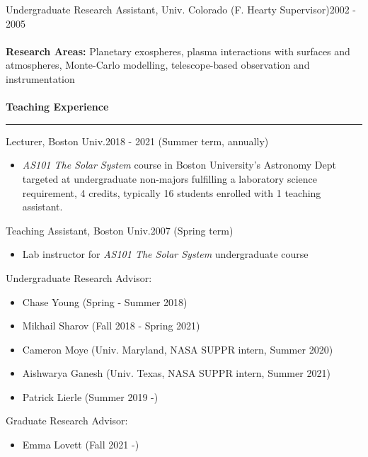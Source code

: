 \documentclass[12pt]{report}
\begin{document}
\noindent Undergraduate Research Assistant, Univ. Colorado (F. Hearty Supervisor)\hfill 2002 - 2005\\
\vspace{1 mm}\\
\textbf{Research Areas:} Planetary exospheres, plasma interactions with surfaces and atmospheres, Monte-Carlo modelling, telescope-based observation and instrumentation\\
\vspace{2 mm}\\
\bf{Teaching Experience}\rm \hspace*{\fill} \\
\rule{\textwidth}{1pt}
\noindent Lecturer, Boston Univ.\hfill 2018 - 2021 (Summer term, annually)
   \begin{itemize} \itemsep -2pt %
   \item \textit{AS101 The Solar System} course in Boston University's Astronomy Dept targeted at undergraduate
non-majors fulfilling a laboratory science requirement, 4 credits, typically 16 students enrolled with 1 teaching assistant.
 \end{itemize}
\noindent Teaching Assistant, Boston Univ.\hfill 2007 (Spring term)
   \begin{itemize} \itemsep -2pt %
   \item Lab instructor for \textit{AS101 The Solar System} undergraduate course
 \end{itemize}
\noindent Undergraduate Research Advisor: 
\begin{itemize} \itemsep -2pt 
	\item Chase Young (Spring - Summer 2018)
	\item Mikhail Sharov (Fall 2018 - Spring 2021)
	\item Cameron Moye (Univ. Maryland, NASA SUPPR intern, Summer 2020)
	\item Aishwarya Ganesh (Univ. Texas, NASA SUPPR intern, Summer 2021)
	\item Patrick Lierle (Summer 2019 -)
\end{itemize}
\noindent Graduate Research Advisor: 
\begin{itemize} \itemsep -2pt 
	\item Emma Lovett (Fall 2021 -)
\end{itemize}
\end{document}
